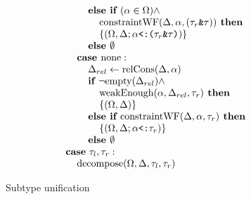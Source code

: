 \documentclass[acmsmall]{acmart}
\begin{document}
\begin{figure*}[h]
\[\begin{array}[t]{@{} l}
  \\
  \I\I\I \B{else if } (\alpha \in \Omega) \wedge 
  \\
  \I\I\I\I \F{constraintWF}(\Delta, \alpha, (\code{$\tau_r$\&$\tau$})) \B{ then }
  \\
  \I\I\I\I \{(\Omega, \Delta;\code{$\alpha$<:($\tau_r$\&$\tau$)})\}
  \\
  \I\I\I \B{else } \emptyset 
  \\
  \I\I \B{case } \F{none} :
  \\
  \I\I\I \Delta_{rel} \leftarrow \F{relCons}(\Delta, \alpha)  
  \\
  \I\I\I \B{if } \neg \F{empty}(\Delta_{rel}) \wedge 
  \\
  \I\I\I\I \F{weakEnough}(\alpha, \Delta_{rel}, \tau_r) \B{ then }
  \\
  \I\I\I\I \{(\Omega, \Delta)\}
  \\
  \I\I\I \B{else if } \F{constraintWF}(\Delta, \alpha, \tau_r) \B{ then }
  \\
  \I\I\I\I \{(\Omega, \Delta;\code{$\alpha$<:$\tau_r$})\}
  \\
  \I\I\I \B{else } \emptyset 

  \\

  \I \B{case}\ \tau_{l}, \tau_{r}:
  \\
  \I\I \F{decompose}(\Omega, \Delta, \tau_{l}, \tau_{r})
\end{array}
\]

\caption{Subtype unification}
\end{figure*}
\end{document}
